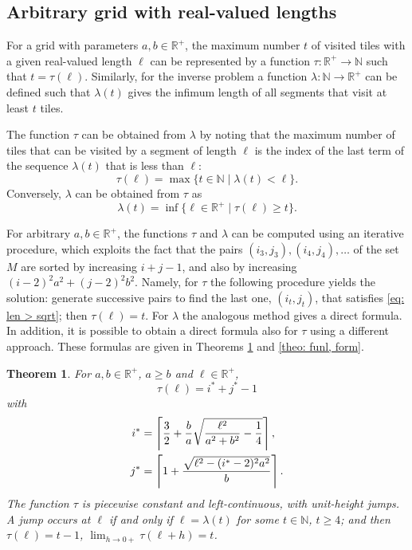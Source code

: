 \documentclass[12pt, a4paper]{article}
\newcommand{\st}{\mid}%
\let\Re\relax %
\DeclareMathOperator{\Re}{Re} %
\newcommand{\funt}{\tau} %
\newcommand{\funl}{\lambda} %
\newcommand{\len}{\ell} %
\newcommand{\tiles}{t} %
\newcommand{\isoli}{i^\ast}
\newcommand{\jsoli}{j^\ast}
\newcommand{\mss}{M}
\newtheorem{theorem}{Theorem}%
\begin{document}
\subsection{Arbitrary grid with real-valued lengths}
\label{part: max: arbitrary grid, real lengths}

For a grid with parameters $a, b \in \mathbb R^+$, the maximum number $\tiles$ of visited tiles with a given real-valued length $\len$ can be represented by a function $\funt: \mathbb R^+ \to \mathbb N$ such that $\tiles = \funt(\len)$. Similarly, for the inverse problem a function $\funl: \mathbb N \to \mathbb R^+$ can be defined such that $\funl(\tiles)$ gives the infimum length of all segments that visit at least $\tiles$ tiles.

The function $\funt$ can be obtained from $\funl$ by noting that the maximum number of tiles that can be visited by a segment of length $\len$ is the index of the last term of the sequence $\funl(\tiles)$ that is less than $\len$:
\begin{equation}
\label{eq: funt funl}
\funt(\len) = \max \{\tiles \in \mathbb N \st \funl(\tiles)<\len\}.
\end{equation}
Conversely, $\funl$ can be obtained from $\funt$ as
\begin{equation}
\label{eq: funl funt}
\funl(\tiles) = \inf\{\len \in \mathbb R^+ \st \funt(\len) \geq \tiles\}.
\end{equation}

For arbitrary $a, b \in \mathbb R^+$, the functions $\funt$ and $\funl$ can be computed using an iterative procedure, which exploits the fact that the pairs $(i_3,j_3), (i_4,j_4), \ldots$ of the set $\mss$ are sorted by increasing $i+j-1$, and also by increasing $(i-2)^2 a^2 + (j-2)^2 b^2$. Namely, for $\funt$ the following procedure yields the solution: generate successive pairs to find the last one, $(i_\tiles,j_\tiles)$, that satisfies \eqref{eq: len > sqrt}; then $\funt(\len) = \tiles$. For $\funl$ the analogous method gives a direct formula. In addition, it is possible to obtain a direct formula also for $\funt$ using a different approach. These formulas are given in Theorems \ref{theo: funt, form} and \ref{theo: funl, form}.

\begin{theorem}
\label{theo: funt, form}
For $a, b \in \mathbb R^+$, $a \geq b$ and $\len \in \mathbb R^+$,
\begin{equation}
\label{eq: theo: funt, form; funt}
\funt(\len) = \isoli+\jsoli-1
\end{equation}
with
\begin{align}
\label{eq: theo: funt, form; i}
\isoli &= \left\lceil \frac 3 2 + \frac b a \Re \sqrt{\frac{\len^2}{a^2+b^2}-\frac 1 4} \right\rceil, \\
\label{eq: theo: funt, form; j}
\jsoli &= \left\lceil 1 + \frac{\sqrt{\len^2-(\isoli-2)^2a^2}}{b} \right\rceil.
\end{align}
The function $\funt$ is piecewise constant and left-continuous, with unit-height jumps. A jump occurs at $\len$ if and only if $\len = \funl(\tiles)$ for some $\tiles \in \mathbb N$, $\tiles \geq 4$; and then $\funt(\len) = \tiles-1$, $\lim_{h \rightarrow 0+} \funt(\len+h) = \tiles$.
\end{theorem}
\end{document}
